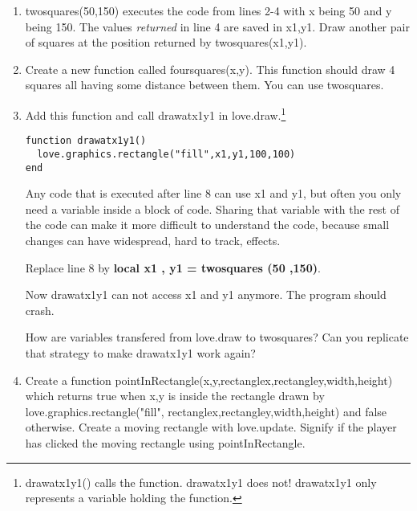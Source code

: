 \documentclass[a4paper, 11pt]{article}
\begin{document}
\begin{enumerate}
\item twosquares(50,150) executes the code from lines 2-4 with x being 50 and y being 150. The values \textit{returned} in line 4 are saved in x1,y1. \newline
      Draw another pair of squares at the position returned by twosquares(x1,y1).
\item Create a new function called foursquares(x,y). This function should draw 4 squares all having some distance between them. You can use twosquares.
\item Add this function and call drawatx1y1 in love.draw.\footnote{drawatx1y1() calls the function. drawatx1y1 does not! drawatx1y1 only represents a variable holding the function.}
\begin{lstlisting}
function drawatx1y1()
  love.graphics.rectangle("fill",x1,y1,100,100)
end
\end{lstlisting}
Any code that is executed after line 8 can use x1 and y1, but often you only need a variable inside a block of code.
Sharing that variable with the rest of the code can make it more difficult to understand the code, because small changes can have widespread, hard to track, effects.

Replace line 8 by \textbf{local x1 , y1 = twosquares (50 ,150)}.

Now drawatx1y1 can not access x1 and y1 anymore. The program should crash.

How are variables transfered from love.draw to twosquares?
Can you replicate that strategy to make drawatx1y1 work again?

\item Create a function pointInRectangle(x,y,rectanglex,rectangley,width,height) which returns true when x,y is inside the rectangle drawn by love.graphics.rectangle("fill", rectanglex,rectangley,width,height) and false otherwise.
      Create a moving rectangle with love.update.
      Signify if the player has clicked the moving rectangle using pointInRectangle.
\end{enumerate}
\end{document}
